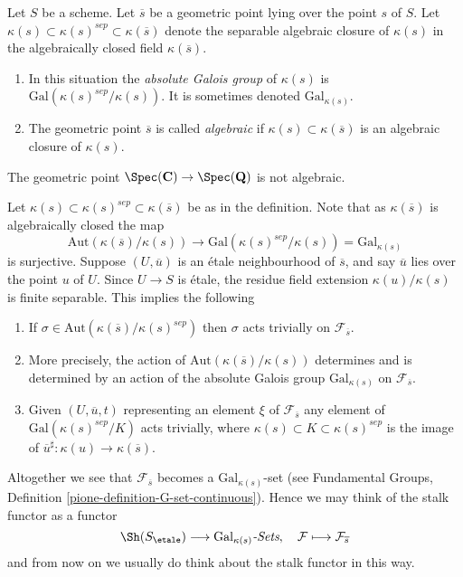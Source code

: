 \begin{definition}
\label{definition-algebraic-geometric-point}
Let $S$ be a scheme.
Let $\overline{s}$ be a geometric point lying over the point $s$ of $S$.
Let $\kappa(s) \subset \kappa(s)^{sep} \subset \kappa(\overline{s})$
denote the separable algebraic closure of $\kappa(s)$ in the algebraically
closed field $\kappa(\overline{s})$.
\begin{enumerate}
\item In this situation the {\it absolute Galois group} of $\kappa(s)$
is $\text{Gal}(\kappa(s)^{sep}/\kappa(s))$. It is sometimes denoted
$\text{Gal}_{\kappa(s)}$.
\item The geometric point $\overline{s}$ is called
{\it algebraic} if $\kappa(s) \subset \kappa(\overline{s})$ is
an algebraic closure of $\kappa(s)$.
\end{enumerate}
\end{definition}

\begin{example}
\label{example-stupid}
The geometric point
$\Spec(\mathbf{C}) \to \Spec(\mathbf{Q})$
is not algebraic.
\end{example}

\noindent
Let $\kappa(s) \subset \kappa(s)^{sep} \subset \kappa(\overline{s})$
be as in the definition. Note that as $\kappa(\overline{s})$ is algebraically
closed the map
$$
\text{Aut}(\kappa(\overline{s})/\kappa(s))
\longrightarrow
\text{Gal}(\kappa(s)^{sep}/\kappa(s)) = \text{Gal}_{\kappa(s)}
$$
is surjective. Suppose $(U, \overline{u})$ is an
\'etale neighbourhood of $\overline{s}$, and say $\overline{u}$ lies over
the point $u$ of $U$. Since $U \to S$ is \'etale, the residue field extension
$\kappa(u)/\kappa(s)$ is finite separable.
This implies the following
\begin{enumerate}
\item If $\sigma \in \text{Aut}(\kappa(\overline{s})/\kappa(s)^{sep})$
then $\sigma$ acts trivially on $\mathcal{F}_{\overline{s}}$.
\item More precisely, the action of
$\text{Aut}(\kappa(\overline{s})/\kappa(s))$
determines and is determined by an action of the absolute Galois group
$\text{Gal}_{\kappa(s)}$ on $\mathcal{F}_{\overline{s}}$.
\item Given $(U, \overline{u}, t)$ representing an element $\xi$ of
$\mathcal{F}_{\overline{s}}$ any element of
$\text{Gal}(\kappa(s)^{sep}/K)$ acts trivially, where
$\kappa(s) \subset K \subset \kappa(s)^{sep}$ is the image of
$\overline{u}^\sharp : \kappa(u) \to \kappa(\overline{s})$.
\end{enumerate}
Altogether we see that $\mathcal{F}_{\overline{s}}$ becomes a
$\text{Gal}_{\kappa(s)}$-set (see
Fundamental Groups, Definition \ref{pione-definition-G-set-continuous}).
Hence we may think of the stalk functor as a functor
$$
\Sh(S_\etale) \longrightarrow
\text{Gal}_{\kappa(s)}\textit{-Sets},
\quad
\mathcal{F} \longmapsto \mathcal{F}_{\overline{s}}
$$
and from now on we usually do think about the stalk functor in this way.

